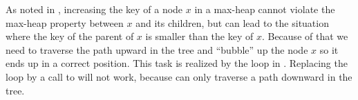 As noted in , increasing the key of a node $x$ in a max-heap cannot violate the max-heap property between $x$ and its children, but can lead to the situation where the key of the parent of $x$ is smaller than the key of $x$.
Because of that we need to traverse the path upward in the tree and ``bubble'' up the node $x$ so it ends up in a correct position.
This task is realized by the  loop in .
Replacing the loop by a call to  will not work, because  can only traverse a path downward in the tree.

